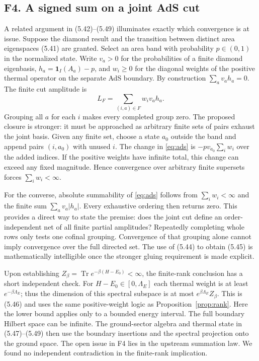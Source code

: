 \documentclass[11pt]{article}
\newcommand{\Tr}{\operatorname{Tr}}
\newcommand{\id}{\mathbf{1}}
\begin{document}
\subsection{F4. A signed sum on a joint AdS cut}
A related argument in (5.42)--(5.49) illuminates exactly which convergence is at issue. Suppose the diamond result and the transition between distinct area eigenspaces (5.41) are granted. Select an area band with probability $p\in(0,1)$ in the normalized state. Write $v_a>0$ for the probabilities of a finite diamond eigenbasis, $h_a=\id_I(A_a)-p$, and $w_i\ge0$ for the diagonal weights of the positive thermal operator on the separate AdS boundary. By construction $\sum_a v_a h_a=0$. The finite cut amplitude is
\begin{equation}\label{eq:ads}
 L_F=\sum_{(i,a)\in F} w_i v_a h_a .
\end{equation}
Grouping all $a$ for each $i$ makes every completed group zero. The proposed closure is stronger: it must be approached as arbitrary finite sets of pairs exhaust the joint basis. Given any finite set, choose a state $a_0$ outside the band and append pairs $(i,a_0)$ with unused $i$. The change in \eqref{eq:ads} is $-p v_{a_0}\sum_i w_i$ over the added indices. If the positive weights have infinite total, this change can exceed any fixed magnitude. Hence convergence over arbitrary finite supersets forces $\sum_i w_i<\infty$.

For the converse, absolute summability of \eqref{eq:ads} follows from $\sum_i w_i<\infty$ and the finite sum $\sum_a v_a|h_a|$. Every exhaustive ordering then returns zero. This provides a direct way to state the premise: does the joint cut define an order-independent net of all finite partial amplitudes? Repeatedly completing whole rows only tests one cofinal grouping. Convergence of that grouping alone cannot imply convergence over the full directed set. The use of (5.44) to obtain (5.45) is mathematically intelligible once the stronger gluing requirement is made explicit.

Upon establishing $Z_\beta=\Tr e^{-\beta(H-E_0)}<\infty$, the finite-rank conclusion has a short independent check. For $H-E_0\in[0,\Lambda_E]$ each thermal weight is at least $e^{-\beta\Lambda_E}$; thus the dimension of this spectral subspace is at most $e^{\beta\Lambda_E}Z_\beta$. This is (5.46) and uses the same positive-weight logic as Proposition~\ref{prop:rank}. Here the lower bound applies only to a bounded energy interval. The full boundary Hilbert space can be infinite. The ground-sector algebra and thermal state in (5.47)--(5.49) then use the boundary insertions and the spectral projection onto the ground space. The open issue in F4 lies in the upstream summation law. We found no independent contradiction in the finite-rank implication.
\end{document}
